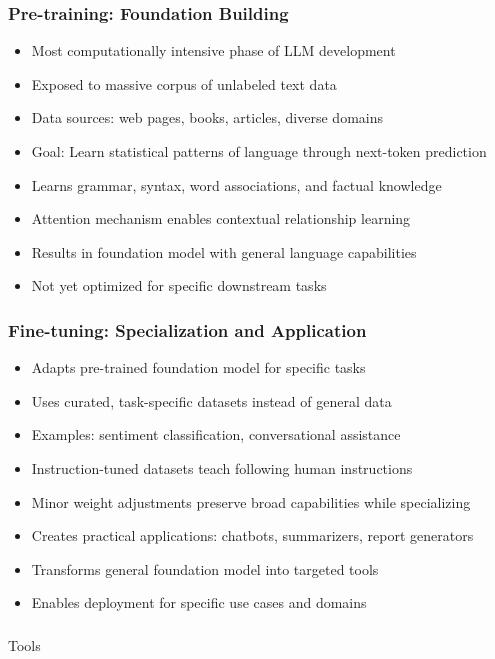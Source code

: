 \begin{frame}[fragile]\frametitle{Pre-training: Foundation Building}
      \begin{itemize}
	  \item Most computationally intensive phase of LLM development
	  \item Exposed to massive corpus of unlabeled text data
	  \item Data sources: web pages, books, articles, diverse domains
	  \item Goal: Learn statistical patterns of language through next-token prediction
	  \item Learns grammar, syntax, word associations, and factual knowledge
	  \item Attention mechanism enables contextual relationship learning
	  \item Results in foundation model with general language capabilities
	  \item Not yet optimized for specific downstream tasks
	  \end{itemize}
\end{frame}

\begin{frame}[fragile]\frametitle{Fine-tuning: Specialization and Application}
      \begin{itemize}
	  \item Adapts pre-trained foundation model for specific tasks
	  \item Uses curated, task-specific datasets instead of general data
	  \item Examples: sentiment classification, conversational assistance
	  \item Instruction-tuned datasets teach following human instructions
	  \item Minor weight adjustments preserve broad capabilities while specializing
	  \item Creates practical applications: chatbots, summarizers, report generators
	  \item Transforms general foundation model into targeted tools
	  \item Enables deployment for specific use cases and domains
	  \end{itemize}
\end{frame}

\begin{frame}[fragile]\frametitle{}
\begin{center}
{\Large Tools}
\end{center}
\end{frame}

